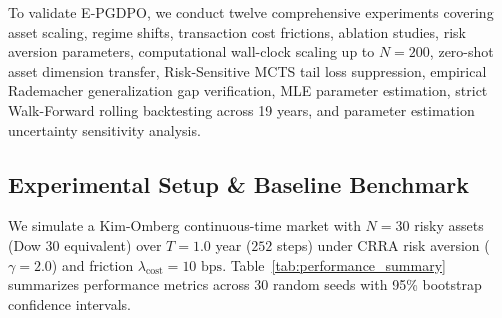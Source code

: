 \documentclass[11pt,a4paper]{article}
\theoremstyle{plain}
\theoremstyle{definition}
\theoremstyle{remark}
\begin{document}
To validate E-PGDPO, we conduct twelve comprehensive experiments covering asset scaling, regime shifts, transaction cost frictions, ablation studies, risk aversion parameters, computational wall-clock scaling up to $N=200$, zero-shot asset dimension transfer, Risk-Sensitive MCTS tail loss suppression, empirical Rademacher generalization gap verification, MLE parameter estimation, strict Walk-Forward rolling backtesting across 19 years, and parameter estimation uncertainty sensitivity analysis.

\subsection{Experimental Setup \& Baseline Benchmark}
We simulate a Kim-Omberg continuous-time market with $N=30$ risky assets (Dow 30 equivalent) over $T=1.0$ year ($252$ steps) under CRRA risk aversion ($\gamma=2.0$) and friction $\lambda_{\text{cost}} = 10\text{ bps}$. Table~\ref{tab:performance_summary} summarizes performance metrics across 30 random seeds with 95\% bootstrap confidence intervals.

\begin{table}[H]
\centering
\caption{Empirical Out-of-Sample Performance Comparison ($N=30$ Assets, Dow 30 Benchmark, 30 Random Seeds, Mean [95\% Bootstrap CI]; $^\dagger$see Appendix Table~\ref{tab:hyperparams} for training hyperparameter and episode count details).}
\label{tab:performance_summary}
\end{table}
\end{document}
